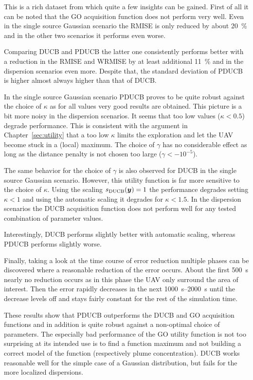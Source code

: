 This is a rich dataset from which quite a few insights can be gained. First of 
all it can be noted that the GO acquisition function does not perform very well.  
Even in the single source Gaussian scenario the RMISE is only reduced by about 
\SI{20}{\percent} and in the other two scenarios it performs even worse.

Comparing DUCB and PDUCB the latter one consistently performs better with 
a reduction in the RMISE and WRMISE by at least additional \SI{11}{\percent} and 
in the dispersion scenarios even more.  Despite that, the standard deviation of 
PDUCB is higher almost always higher than that of DUCB\@.

In the single source Gaussian scenario PDUCB proves to be quite robust against 
the choice of $\kappa$ as for all values very good results are obtained. This 
picture is a bit more noisy in the dispersion scenarios. It seems that too low 
values ($\kappa < 0.5$) degrade performance. This is consistent with the 
argument in Chapter~\ref{sec:utility} that a too low $\kappa$ limits the 
exploration and let the UAV become stuck in a (local) maximum. The choice of 
$\gamma$ has no considerable effect as long as the distance penalty is not 
chosen too large ($\gamma < -10^{-5}$).

The same behavior for the choice of $\gamma$ is also observed for DUCB in the 
single source Gaussian scenario. However, this utility function is far more 
sensitive to the choice of $\kappa$. Using the scaling $s_{\mathrm{DUCB}}(\bm{y}) = 1$ 
the performance degrades setting $\kappa < 1$ and using the automatic scaling it 
degrades for $\kappa < 1.5$. In the dispersion scenarios the DUCB acquisition 
function does not perform well for any tested combination of parameter values.

Interestingly,  DUCB performs slightly better with automatic scaling, whereas 
PDUCB performs slightly worse.

Finally, taking a look at the time course of error reduction multiple phases can 
be discovered where a reasonable reduction of the error occurs. About the first 
\SI{500}{\second} nearly no reduction occurs as in this phase the UAV only 
surround the area of interest. Then the error rapidly decreases in the next 
\SIrange{1000}{2000}{\second} until the decrease levels off and stays fairly 
constant for the rest of the simulation time.

These results show that PDUCB outperforms the DUCB and GO acquisition functions 
and in addition is quite robust against a non-optimal choice of parameters. The 
especially bad performance of the GO utility function is not too surprising at 
its intended use is to find a function maximum and not building a correct model 
of the function (respectively plume concentration).  DUCB works reasonable well 
for the simple case of a Gaussian distribution, but fails for the more localized 
dispersions.


